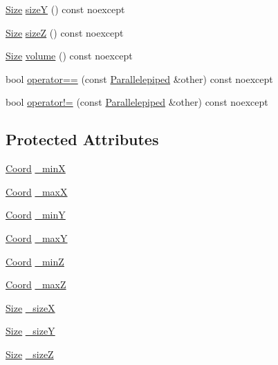 \begin{DoxyCompactItemize}
\item 
\hyperlink{struct_size}{Size} \hyperlink{struct_parallelepiped_a4dd40c102d8f16473ce2de8a5a93e102}{size\-Y} () const noexcept
\item 
\hyperlink{struct_size}{Size} \hyperlink{struct_parallelepiped_ab259bb38f5743f1f33738f4774b33848}{size\-Z} () const noexcept
\item 
\hyperlink{struct_size}{Size} \hyperlink{struct_parallelepiped_a0862330294ca2ca177308d2fef56dffa}{volume} () const noexcept
\item 
bool \hyperlink{struct_parallelepiped_afe121f86b46f64ebd388351ff4f06440}{operator==} (const \hyperlink{struct_parallelepiped}{Parallelepiped} \&other) const noexcept
\item 
bool \hyperlink{struct_parallelepiped_ab7c62b8191d9e9f5c61adb90d8042c2e}{operator!=} (const \hyperlink{struct_parallelepiped}{Parallelepiped} \&other) const noexcept
\end{DoxyCompactItemize}
\subsection*{Protected Attributes}
\begin{DoxyCompactItemize}
\item 
\hyperlink{struct_coord}{Coord} \hyperlink{struct_parallelepiped_a0f5449743f2123c17167b7f7c72ef1bb}{\-\_\-min\-X}
\item 
\hyperlink{struct_coord}{Coord} \hyperlink{struct_parallelepiped_a4dbb9c56d7fe012c596ce7d1895b61ff}{\-\_\-max\-X}
\item 
\hyperlink{struct_coord}{Coord} \hyperlink{struct_parallelepiped_a5771e43afdf839db265e15405cb2cf06}{\-\_\-min\-Y}
\item 
\hyperlink{struct_coord}{Coord} \hyperlink{struct_parallelepiped_aaed9c078439f031300ffab10c88fbac5}{\-\_\-max\-Y}
\item 
\hyperlink{struct_coord}{Coord} \hyperlink{struct_parallelepiped_a236bbf5d0a7354f2f8c11566a9552631}{\-\_\-min\-Z}
\item 
\hyperlink{struct_coord}{Coord} \hyperlink{struct_parallelepiped_a4f3f924bce7e2d0531e169a2cddc3772}{\-\_\-max\-Z}
\item 
\hyperlink{struct_size}{Size} \hyperlink{struct_parallelepiped_abff135261e4f3e6e8ea9c6dd185de0cd}{\-\_\-size\-X}
\item 
\hyperlink{struct_size}{Size} \hyperlink{struct_parallelepiped_a722af4ec16bb4ede57cb73a527d16dbf}{\-\_\-size\-Y}
\item 
\hyperlink{struct_size}{Size} \hyperlink{struct_parallelepiped_a99b032966bf653c13ca8d9645ad14b5e}{\-\_\-size\-Z}
\end{DoxyCompactItemize}


